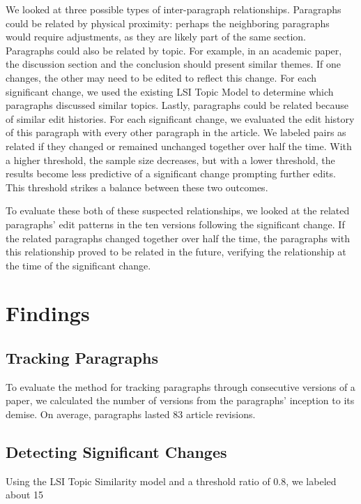 We looked at three possible types of inter-paragraph relationships.
Paragraphs could be related by physical proximity: perhaps the
neighboring paragraphs would require adjustments, as they are likely
part of the same section. Paragraphs could also be related by topic. For
example, in an academic paper, the discussion section and the conclusion
should present similar themes. If one changes, the other may need to be
edited to reflect this change. For each significant change, we used the
existing LSI Topic Model to determine which paragraphs discussed similar
topics. Lastly, paragraphs could be related because of similar edit
histories. For each significant change, we evaluated the edit history of
this paragraph with every other paragraph in the article. We labeled
pairs as related if they changed or remained unchanged together over
half the time. With a higher threshold, the sample size decreases, but
with a lower threshold, the results become less predictive of a
significant change prompting further edits. This threshold strikes a
balance between these two outcomes.

To evaluate these both of these suspected relationships, we looked at
the related paragraphs' edit patterns in the ten versions following the
significant change. If the related paragraphs changed together over half
the time, the paragraphs with this relationship proved to be related in
the future, verifying the relationship at the time of the significant
change.

\section{Findings}\label{findings}

\subsection{Tracking Paragraphs}\label{tracking-paragraphs-1}

To evaluate the method for tracking paragraphs through consecutive
versions of a paper, we calculated the number of versions from the
paragraphs' inception to its demise. On average, paragraphs lasted 83
article revisions.

\subsection{Detecting Significant
Changes}\label{detecting-significant-changes}

Using the LSI Topic Similarity model and a threshold ratio of 0.8, we
labeled about 15

